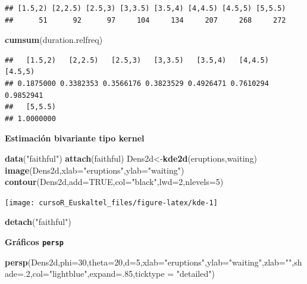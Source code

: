 \documentclass[]{book}
\newenvironment{Shaded}{\begin{snugshade}}{\end{snugshade}}
\newcommand{\KeywordTok}[1]{\textcolor[rgb]{0.13,0.29,0.53}{\textbf{#1}}}
\newcommand{\DataTypeTok}[1]{\textcolor[rgb]{0.13,0.29,0.53}{#1}}
\newcommand{\DecValTok}[1]{\textcolor[rgb]{0.00,0.00,0.81}{#1}}
\newcommand{\StringTok}[1]{\textcolor[rgb]{0.31,0.60,0.02}{#1}}
\newcommand{\OtherTok}[1]{\textcolor[rgb]{0.56,0.35,0.01}{#1}}
\newcommand{\NormalTok}[1]{#1}
\begin{document}
\begin{verbatim}
## [1.5,2) [2,2.5) [2.5,3) [3,3.5) [3.5,4) [4,4.5) [4.5,5) [5,5.5) 
##      51      92      97     104     134     207     268     272
\end{verbatim}

\begin{Shaded}
\begin{Highlighting}[]
\KeywordTok{cumsum}\NormalTok{(duration.relfreq)}
\end{Highlighting}
\end{Shaded}

\begin{verbatim}
##   [1.5,2)   [2,2.5)   [2.5,3)   [3,3.5)   [3.5,4)   [4,4.5)   [4.5,5) 
## 0.1875000 0.3382353 0.3566176 0.3823529 0.4926471 0.7610294 0.9852941 
##   [5,5.5) 
## 1.0000000
\end{verbatim}

\textbf{Estimación bivariante tipo kernel}

\begin{Shaded}
\begin{Highlighting}[]
\KeywordTok{data}\NormalTok{(}\StringTok{"faithful"}\NormalTok{)}
\KeywordTok{attach}\NormalTok{(faithful)}
\NormalTok{Dens2d<-}\KeywordTok{kde2d}\NormalTok{(eruptions,waiting)}
\KeywordTok{image}\NormalTok{(Dens2d,}\DataTypeTok{xlab=}\StringTok{"eruptions"}\NormalTok{,}\DataTypeTok{ylab=}\StringTok{"waiting"}\NormalTok{)}
\KeywordTok{contour}\NormalTok{(Dens2d,}\DataTypeTok{add=}\OtherTok{TRUE}\NormalTok{,}\DataTypeTok{col=}\StringTok{"black"}\NormalTok{,}\DataTypeTok{lwd=}\DecValTok{2}\NormalTok{,}\DataTypeTok{nlevels=}\DecValTok{5}\NormalTok{)}
\end{Highlighting}
\end{Shaded}

\begin{center}\texttt{[image: cursoR\_Euskaltel\_files/figure-latex/kde-1]} \end{center}

\begin{Shaded}
\begin{Highlighting}[]
\KeywordTok{detach}\NormalTok{(}\StringTok{"faithful"}\NormalTok{)}
\end{Highlighting}
\end{Shaded}

\textbf{Gráficos \texttt{persp}}

\begin{Shaded}
\begin{Highlighting}[]
\KeywordTok{persp}\NormalTok{(Dens2d,}\DataTypeTok{phi=}\DecValTok{30}\NormalTok{,}\DataTypeTok{theta=}\DecValTok{20}\NormalTok{,}\DataTypeTok{d=}\DecValTok{5}\NormalTok{,}\DataTypeTok{xlab=}\StringTok{"eruptions"}\NormalTok{,}\DataTypeTok{ylab=}\StringTok{"waiting"}\NormalTok{,}\DataTypeTok{zlab=}\StringTok{""}\NormalTok{,}\DataTypeTok{shade=}\NormalTok{.}\DecValTok{2}\NormalTok{,}\DataTypeTok{col=}\StringTok{"lightblue"}\NormalTok{,}\DataTypeTok{expand=}\NormalTok{.}\DecValTok{85}\NormalTok{,}\DataTypeTok{ticktype =} \StringTok{"detailed"}\NormalTok{)}
\end{Highlighting}
\end{Shaded}
\end{document}

